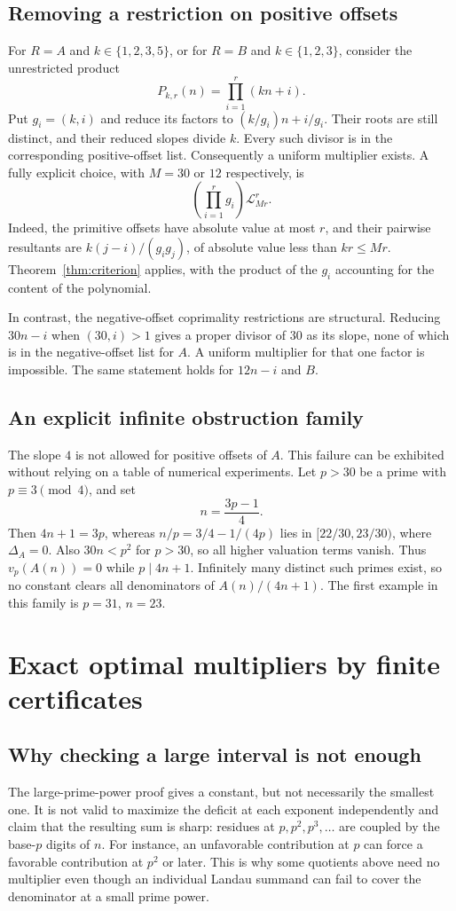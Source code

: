 \documentclass[11pt]{article}
\theoremstyle{definition}
\theoremstyle{remark}
\newcommand{\vp}{v_p}
\newcommand{\LL}{\mathcal L}
\begin{document}
\subsection{Removing a restriction on positive offsets}
For $R=A$ and $k\in\{1,2,3,5\}$, or for $R=B$ and
$k\in\{1,2,3\}$, consider the unrestricted product
\[
 P_{k,r}(n)=\prod_{i=1}^r(kn+i).
\]
Put $g_i=(k,i)$ and reduce its factors to
$(k/g_i)n+i/g_i$. Their roots are still distinct, and their reduced
slopes divide $k$. Every such divisor is in the corresponding
positive-offset list. Consequently a uniform multiplier exists.
A fully explicit choice, with $M=30$ or $12$ respectively, is
\begin{equation}\label{eq:unrestricted}
 \left(\prod_{i=1}^r g_i\right)\LL_{Mr}^{r}.
\end{equation}
Indeed, the primitive offsets have absolute value at most $r$, and
their pairwise resultants are
$k(j-i)/(g_i g_j)$, of absolute value less than $kr\leq Mr$.
Theorem~\ref{thm:criterion} applies, with the product of the $g_i$
accounting for the content of the polynomial.

In contrast, the negative-offset coprimality restrictions are
structural. Reducing $30n-i$ when $(30,i)>1$ gives a proper divisor of
$30$ as its slope, none of which is in the negative-offset list for
$A$. A uniform multiplier for that one factor is impossible. The same
statement holds for $12n-i$ and $B$.

\subsection{An explicit infinite obstruction family}
The slope $4$ is not allowed for positive offsets of $A$. This failure
can be exhibited without relying on a table of numerical experiments.
Let $p>30$ be a prime with $p\equiv3\pmod4$, and set
\[
 n=\frac{3p-1}{4}.
\]
Then $4n+1=3p$, whereas
$n/p=3/4-1/(4p)$ lies in $[22/30,23/30)$, where $\Delta_A=0$.
Also $30n<p^2$ for $p>30$, so all higher valuation terms vanish.
Thus $\vp(A(n))=0$ while $p\mid4n+1$. Infinitely many distinct such
primes exist, so no constant clears all denominators of $A(n)/(4n+1)$.
The first example in this family is $p=31$, $n=23$.

\section{Exact optimal multipliers by finite certificates}\label{sec:sharp}
\subsection{Why checking a large interval is not enough}
The large-prime-power proof gives a constant, but not necessarily the
smallest one. It is not valid to maximize the deficit at each exponent
independently and claim that the resulting sum is sharp: residues
at $p,p^2,p^3,\ldots$ are coupled by the base-$p$ digits of $n$.
For instance, an unfavorable contribution at $p$ can force a favorable
contribution at $p^2$ or later. This is why some quotients above need
no multiplier even though an individual Landau summand can fail to
cover the denominator at a small prime power.
\end{document}
